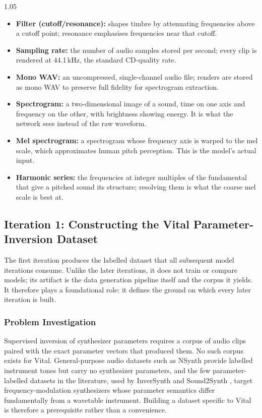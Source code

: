 \begin{center}
{{\begin{spacing}{1.05}
\begin{itemize}[leftmargin=1.4em, itemsep=1.5pt, topsep=3pt, parsep=0pt]
  \item \textbf{Filter (cutoff/resonance):} shapes timbre by attenuating frequencies above a cutoff point; resonance emphasises frequencies near that cutoff.
  \item \textbf{Sampling rate:} the number of audio samples stored per second; every clip is rendered at 44.1\,kHz, the standard CD-quality rate.
  \item \textbf{Mono WAV:} an uncompressed, single-channel audio file; renders are stored as mono WAV to preserve full fidelity for spectrogram extraction.
  \item \textbf{Spectrogram:} a two-dimensional image of a sound, time on one axis and frequency on the other, with brightness showing energy. It is what the network sees instead of the raw waveform.
  \item \textbf{Mel spectrogram:} a spectrogram whose frequency axis is warped to the mel scale, which approximates human pitch perception. This is the model's actual input.
  \item \textbf{Harmonic series:} the frequencies at integer multiples of the fundamental that give a pitched sound its structure; resolving them is what the coarse mel scale is best at.
\end{itemize}
\end{spacing}
}}
\end{center}

\subsection{Iteration 1: Constructing the Vital Parameter-Inversion Dataset}
\label{sec:iteration1}

\noindent
The first iteration produces the labelled dataset that all subsequent model iterations consume. Unlike the later iterations, it does not train or compare models; its artifact is the data generation pipeline itself and the corpus it yields. It therefore plays a foundational role: it defines the ground on which every later iteration is built.

\subsubsection{Problem Investigation}

\noindent
Supervised inversion of synthesizer parameters requires a corpus of audio clips paired with the exact parameter vectors that produced them. No such corpus exists for Vital. General-purpose audio datasets such as NSynth provide labelled instrument tones but carry no synthesizer parameters, and the few parameter-labelled datasets in the literature, used by InverSynth \cite{barkan2019inversynth} and Sound2Synth \cite{chen2022sound2synth}, target frequency-modulation synthesizers whose parameter semantics differ fundamentally from a wavetable instrument. Building a dataset specific to Vital is therefore a prerequisite rather than a convenience.

